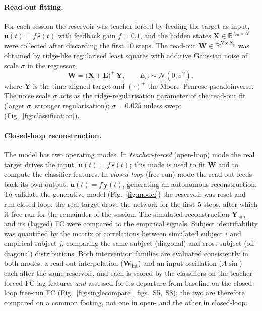 \documentclass[11pt]{article}
\begin{document}
\paragraph{Read-out fitting.}
For each session the reservoir was teacher-forced by feeding the target as
input, $\mathbf{u}(t)=f\,\hat{\mathbf{s}}(t)$ with feedback gain $f=0.1$, and
the hidden states $\mathbf{X}\in\mathbb{R}^{T_{\mathrm{eff}}\times N}$ were
collected after discarding the first $10$ steps. The read-out
$\mathbf{W}\in\mathbb{R}^{N\times N_{\mathrm{p}}}$ was obtained by
ridge-like regularised least squares with additive Gaussian noise of scale
$\sigma$ in the regressor,
\begin{equation}
\mathbf{W} = \bigl(\mathbf{X}+\mathbf{E}\bigr)^{+}\,\mathbf{Y},
\qquad E_{ij}\sim\mathcal{N}(0,\sigma^{2}),
\end{equation}
where $\mathbf{Y}$ is the time-aligned target and $(\cdot)^{+}$ the
Moore--Penrose pseudoinverse. The noise scale $\sigma$ acts as the
ridge-regularisation parameter of the read-out fit (larger $\sigma$, stronger
regularisation); $\sigma=0.025$ unless swept
(Fig.~\ref{fig:classification}).

\paragraph{Closed-loop reconstruction.}
The model has two operating modes. In \emph{teacher-forced} (open-loop) mode the
real target drives the input, $\mathbf{u}(t)=f\,\hat{\mathbf{s}}(t)$; this mode is
used to fit $\mathbf{W}$ and to compute the classifier features. In
\emph{closed-loop} (free-run) mode the read-out feeds back its own output,
$\mathbf{u}(t)=f\,\mathbf{y}(t)$, generating an autonomous reconstruction. To
validate the generative model (Fig.~\ref{fig:model}) the reservoir was reset and
run closed-loop: the real target drove the network for the first $5$ steps, after
which it free-ran for the remainder of the session. The
simulated reconstruction $\mathbf{Y}_{\mathrm{sim}}$ and its (lagged) FC were
compared to the empirical signals. Subject identifiability was quantified by
the matrix of correlations between simulated subject $i$ and empirical subject
$j$, comparing the same-subject (diagonal) and cross-subject (off-diagonal)
distributions. Both intervention families are evaluated consistently in both
modes: a read-out interpolation ($\mathbf{W}_{\mathrm{int}}$) and an input
oscillation ($A\sin$) each alter the same reservoir, and each is scored by the
classifiers on the teacher-forced FC-lag features \emph{and} assessed for its
departure from baseline on the closed-loop free-run FC
(Fig.~\ref{fig:singlecompare}, figs.~S5,~S8); the two are therefore compared on a
common footing, not one in open- and the other in closed-loop.
\end{document}
